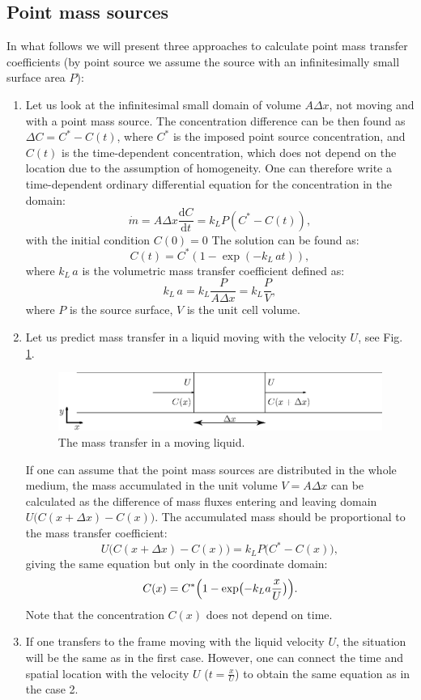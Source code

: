 \documentclass{article}
\newcommand{\beq}{\begin{equation}}
\newcommand{\feq}{\end{equation}}
\newcommand{\vol}{k_L\,a}
\newcommand{\cstar}{C^{*}}
\begin{document}
\subsection{Point mass sources}
In what follows we will present three approaches to calculate point  mass transfer
coefficients (by point source we assume the source with an infinitesimally small surface area $P$):
\begin{enumerate}
\item
Let us look at the infinitesimal small domain of volume $A \Delta x$, not
moving and with a point mass source.  The concentration difference can be then found as $\Delta C =
\cstar -
C(t)$, where $\cstar$ is the imposed point source concentration, and $C(t)$ is
the time-dependent concentration, which does not depend on the location due to the assumption of
homogeneity. One can therefore write a time-dependent ordinary differential equation for the
concentration in the domain:
\beq
\dot{m}= A \Delta x \frac{\mathrm{d}C}{\mathrm{d} t} = k_L P (\cstar-C(t)), 
\feq
with the initial condition $C(0)=0$
The solution can be found as:
\beq
C(t)= \cstar (1-\exp(-\vol t )), 
\feq
where $\vol$ is the volumetric mass transfer coefficient defined as:
\beq
\vol=k_L \frac{P}{A \Delta x}=k_L \frac{P}{V},
\feq
where $P$ is the source surface, $V$ is the unit cell volume.
\item
Let us predict mass transfer in a liquid moving with the velocity
$U$, see Fig. \ref{fig:moving:frame}. 
\begin{figure}[htb!]
\includegraphics[width=\textwidth]{Figures/mass_transfer.eps}
\caption{The mass transfer in a moving liquid. \label{fig:moving:frame}}
\end{figure}

If one can assume that the point mass sources are distributed in the whole
medium, the mass accumulated in the unit volume $V=A \Delta x$ can be
calculated as the difference of mass fluxes entering and leaving domain $U
\bigl(C(x+\Delta x)-C(x)\bigr)$. The accumulated mass should be proportional to
the mass transfer coefficient:
\beq
U \bigl(C(x+\Delta x)-C(x)\bigr)=k_L P \bigl(\cstar-C(x)\bigr), 
\feq 
giving the same equation but only in the coordinate domain:
\beq
C(x)= \cstar \Bigl(1-\exp\bigl(-k_L a \frac{x}{U} \bigr)\Bigr).
\label{main:mass:transfer:expression} 
\feq
Note that the concentration $C(x)$ does not depend on time. 

\item If one transfers to the frame moving with the liquid velocity $U$, the situation will be
the same as in the first case. However, one can connect the time and spatial location with the
velocity $U$ ($t=\frac{x}{U}$) to obtain the same equation as in the case 2.
\end{enumerate}
\end{document}
